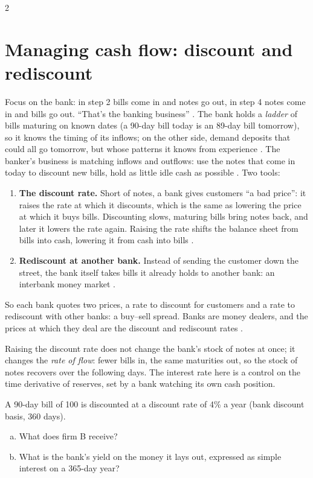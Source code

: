 \begin{paracol}{2}
\section{Managing cash flow: discount and rediscount}\label{sec:bg-cashflow}

Focus on the bank: in step 2 bills come in and notes go out, in step 4 notes come in and bills go out. ``That's the banking business'' . The bank holds a
\emph{ladder} of bills maturing on known dates (a 90-day bill today is an 89-day bill tomorrow), so it knows the timing of its inflows; on the other side, demand deposits that
could all go tomorrow, but whose patterns it knows from experience . The banker's business is matching inflows and outflows: use the notes that
come in today to discount new bills, hold as little idle cash as possible . Two tools:
\begin{enumerate}
  \item \textbf{The discount rate.} Short of notes, a bank gives customers ``a bad price'': it raises the rate at which it discounts, which is the same as lowering the price at which
        it buys bills. Discounting slows, maturing bills bring notes back, and later it lowers the rate again. Raising the rate shifts the balance sheet from bills into cash, lowering
        it from cash into bills .
  \item \textbf{Rediscount at another bank.} Instead of sending the customer down the street, the bank itself takes bills it already holds to another bank: an interbank money market
        .
\end{enumerate}
So each bank quotes two prices, a rate to discount for customers and a rate to rediscount with other banks: a buy--sell spread. Banks are money dealers, and the prices at which they
deal are the discount and rediscount rates .

\begin{intuition}
Raising the discount rate does not change the bank's stock of notes at once; it changes the \emph{rate of flow}: fewer bills in, the same maturities out, so the stock of notes
recovers over the following days. The interest rate here is a control on the time derivative of reserves, set by a bank watching its own cash position.
\end{intuition}

\begin{exercise}
A 90-day bill of 100 is discounted at a discount rate of 4\% a year (bank discount basis, 360 days).
\begin{enumerate}[(a)]
  \item What does firm B receive?
  \item What is the bank's yield on the money it lays out, expressed as simple interest on a 365-day year?
\end{enumerate}
\end{exercise}


\end{paracol}
